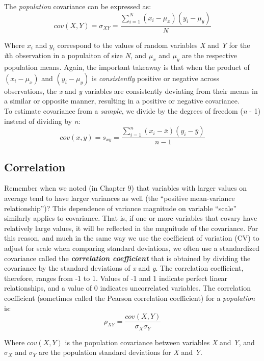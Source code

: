 \documentclass[]{book}
\begin{document}
The \emph{population} covariance can be expressed as:
\[cov(X,Y)=\sigma_{XY}=\frac{\sum_{i=1}^N (x_i-\mu_x)(y_i-\mu_y)}{N}\]

Where \(x_i\) and \(y_i\) correspond to the values of random variables \emph{X} and \emph{Y} for the \emph{i}th observation in a populaiton of size \emph{N}, and \(\mu_x\) and \(\mu_y\) are the respective population means. Again, the important takeaway is that when the product of \((x_i-\mu_x)\) and \((y_i-\mu_y)\) is \emph{consistently} positive or negative across observations, the \emph{x} and \emph{y} variables are consistently deviating from their means in a similar or opposite manner, resulting in a positive or negative covariance.\\

To estimate covariance from a \emph{sample}, we divide by the degrees of freedom (\emph{n} - 1) instead of dividing by \emph{n}:
\[cov(x,y)=s_{xy}=\frac{\sum_{i=1}^n (x_i-\bar{x})(y_i-\bar{y})}{n-1}\]

\hypertarget{correlation}{%
\subsection{Correlation}\label{correlation}}

Remember when we noted (in Chapter 9) that variables with larger values on average tend to have larger variances as well (the ``positive mean-variance relationship'')? This dependence of variance magnitude on variable ``scale'' similarly applies to covariance. That is, if one or more variables that covary have relatively large values, it will be reflected in the magnitude of the covariance. For this reason, and much in the same way we use the coefficient of variation (CV) to adjust for scale when comparing standard deviations, we often use a standardized covariance called the \textbf{\emph{correlation coefficient}} that is obtained by dividing the covariance by the standard deviations of \emph{x} and \emph{y}. The correlation coefficient, therefore, ranges from -1 to 1. Values of -1 and 1 indicate perfect linear relationships, and a value of 0 indicates uncorrelated variables. The correlation coefficient (sometimes called the Pearson correlation coefficient) for a \emph{population} is:
\[\rho_{XY}=\frac{cov(X,Y)}{\sigma_X\sigma_Y} \]

Where \(cov(X,Y)\) is the population covariance between variables \emph{X} and \emph{Y}, and \(\sigma_X\) and \(\sigma_Y\) are the population standard deviations for \emph{X} and \emph{Y}.
\end{document}
